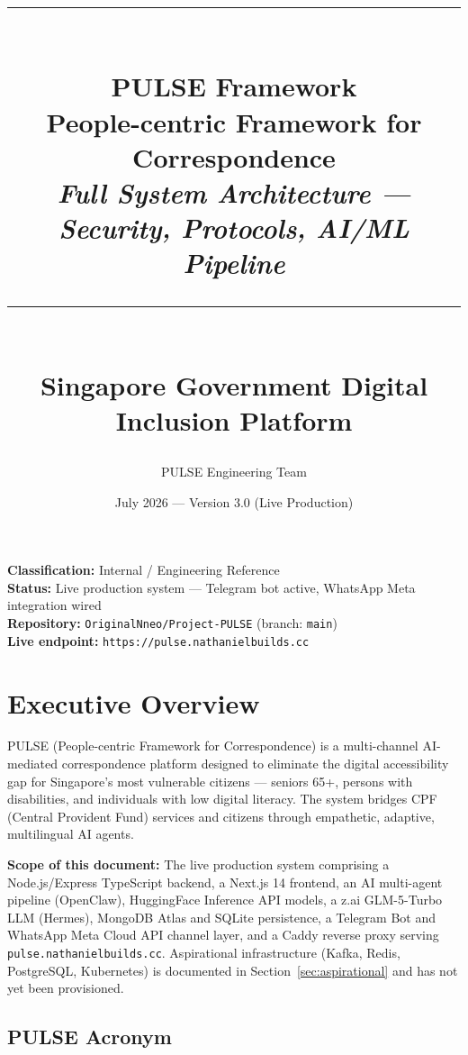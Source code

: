\documentclass[12pt,a4paper]{article}
\title{
  \vspace{-1cm}
  {\color{pulseteal}\rule{\linewidth}{2pt}}\\[0.4cm]
  {\Huge\bfseries\color{pulseteal} PULSE Framework}\\[0.2cm]
  {\Large People-centric Framework for Correspondence}\\[0.2cm]
  {\large\textit{Full System Architecture — Security, Protocols, AI/ML Pipeline}}\\[0.3cm]
  {\color{pulseteal}\rule{\linewidth}{1pt}}\\[0.3cm]
  {\normalsize Singapore Government Digital Inclusion Platform}
}
\author{PULSE Engineering Team}
\date{July 2026 — Version 3.0 (Live Production)}
\begin{document}

\maketitle
\thispagestyle{fancy}

\begin{callout}
\textbf{Classification:} Internal / Engineering Reference \\
\textbf{Status:} Live production system — Telegram bot active, WhatsApp Meta integration wired \\
\textbf{Repository:} \texttt{OriginalNneo/Project-PULSE} (branch: \texttt{main}) \\
\textbf{Live endpoint:} \texttt{https://pulse.nathanielbuilds.cc}
\end{callout}

\vspace{1em}
\tableofcontents
\newpage

\section{Executive Overview}

PULSE (People-centric Framework for Correspondence) is a multi-channel AI-mediated
correspondence platform designed to eliminate the digital accessibility gap for
Singapore's most vulnerable citizens — seniors 65+, persons with disabilities, and
individuals with low digital literacy. The system bridges CPF (Central Provident Fund)
services and citizens through empathetic, adaptive, multilingual AI agents.

\begin{callout}
\textbf{Scope of this document:} The live production system comprising a Node.js/Express
TypeScript backend, a Next.js 14 frontend, an AI multi-agent pipeline (OpenClaw), HuggingFace
Inference API models, a z.ai GLM-5-Turbo LLM (Hermes), MongoDB Atlas and SQLite persistence,
a Telegram Bot and WhatsApp Meta Cloud API channel layer, and a Caddy reverse proxy serving
\texttt{pulse.nathanielbuilds.cc}. Aspirational infrastructure (Kafka, Redis, PostgreSQL,
Kubernetes) is documented in Section~\ref{sec:aspirational} and has not yet been provisioned.
\end{callout}

\subsection{PULSE Acronym}
\end{document}
